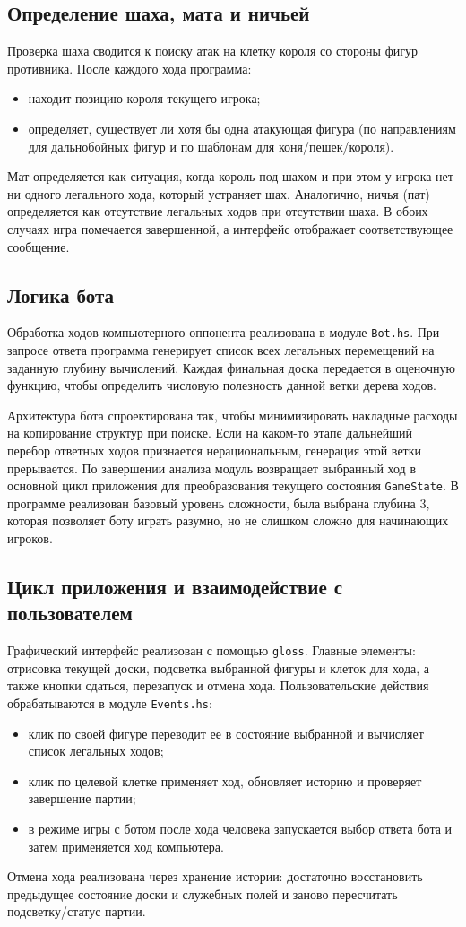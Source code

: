 \subsection{Определение шаха, мата и ничьей}
Проверка шаха сводится к поиску атак на клетку короля со стороны фигур противника. После каждого хода программа:
\begin{itemize}
    \item находит позицию короля текущего игрока;
    \item определяет, существует ли хотя бы одна атакующая фигура (по направлениям для дальнобойных фигур и по шаблонам для коня/пешек/короля).
\end{itemize}
Мат определяется как ситуация, когда король под шахом и при этом у игрока нет ни одного легального хода, который устраняет шах. Аналогично, ничья (пат) определяется как отсутствие легальных ходов при отсутствии шаха. В обоих случаях игра помечается завершенной, а интерфейс отображает соответствующее сообщение.

\subsection{Логика бота}
Обработка ходов компьютерного оппонента реализована в модуле \texttt{Bot.hs}. При запросе ответа программа генерирует список всех легальных перемещений на заданную глубину вычислений. Каждая финальная доска передается в оценочную функцию, чтобы определить числовую полезность данной ветки дерева ходов.

Архитектура бота спроектирована так, чтобы минимизировать накладные расходы на копирование структур при поиске. Если на каком-то этапе дальнейший перебор ответных ходов признается нерациональным, генерация этой ветки прерывается. По завершении анализа модуль возвращает выбранный ход в основной цикл приложения для преобразования текущего состояния \texttt{GameState}. В программе реализован базовый уровень сложности, была выбрана глубина 3, которая позволяет боту играть разумно, но не слишком сложно для начинающих игроков.

\subsection{Цикл приложения и взаимодействие с пользователем}
Графический интерфейс реализован с помощью \texttt{gloss}. Главные элементы: отрисовка текущей доски, подсветка выбранной фигуры и клеток для хода, а также кнопки сдаться, перезапуск и отмена хода. Пользовательские действия обрабатываются в модуле \texttt{Events.hs}:
\begin{itemize}
    \item клик по своей фигуре переводит ее в состояние выбранной и вычисляет список легальных ходов;
    \item клик по целевой клетке применяет ход, обновляет историю и проверяет завершение партии;
    \item в режиме игры с ботом после хода человека запускается выбор ответа бота и затем применяется ход компьютера.
\end{itemize}
Отмена хода реализована через хранение истории: достаточно восстановить предыдущее состояние доски и служебных полей и заново пересчитать подсветку/статус партии.

